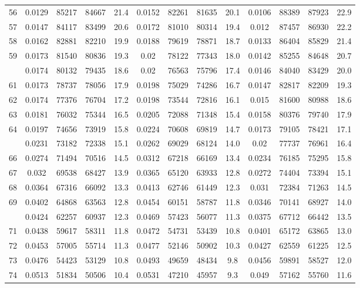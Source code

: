 \documentclass[
  14pt,
]{article}
\begin{document}
\begin{longtable}[t]{lcccccccccccc}
56 & 0.0129 & 85217 & 84667 & 21.4 & 0.0152 & 82261 & 81635 & 20.1 & 0.0106 & 88389 & 87923 & 22.9\\
57 & 0.0147 & 84117 & 83499 & 20.6 & 0.0172 & 81010 & 80314 & 19.4 & 0.012 & 87457 & 86930 & 22.2\\
58 & 0.0162 & 82881 & 82210 & 19.9 & 0.0188 & 79619 & 78871 & 18.7 & 0.0133 & 86404 & 85829 & 21.4\\
59 & 0.0173 & 81540 & 80836 & 19.3 & 0.02 & 78122 & 77343 & 18.0 & 0.0142 & 85255 & 84648 & 20.7\\
\addlinespace
60 & 0.0174 & 80132 & 79435 & 18.6 & 0.02 & 76563 & 75796 & 17.4 & 0.0146 & 84040 & 83429 & 20.0\\
61 & 0.0173 & 78737 & 78056 & 17.9 & 0.0198 & 75029 & 74286 & 16.7 & 0.0147 & 82817 & 82209 & 19.3\\
62 & 0.0174 & 77376 & 76704 & 17.2 & 0.0198 & 73544 & 72816 & 16.1 & 0.015 & 81600 & 80988 & 18.6\\
63 & 0.0181 & 76032 & 75344 & 16.5 & 0.0205 & 72088 & 71348 & 15.4 & 0.0158 & 80376 & 79740 & 17.9\\
64 & 0.0197 & 74656 & 73919 & 15.8 & 0.0224 & 70608 & 69819 & 14.7 & 0.0173 & 79105 & 78421 & 17.1\\
\addlinespace
65 & 0.0231 & 73182 & 72338 & 15.1 & 0.0262 & 69029 & 68124 & 14.0 & 0.02 & 77737 & 76961 & 16.4\\
66 & 0.0274 & 71494 & 70516 & 14.5 & 0.0312 & 67218 & 66169 & 13.4 & 0.0234 & 76185 & 75295 & 15.8\\
67 & 0.032 & 69538 & 68427 & 13.9 & 0.0365 & 65120 & 63933 & 12.8 & 0.0272 & 74404 & 73394 & 15.1\\
68 & 0.0364 & 67316 & 66092 & 13.3 & 0.0413 & 62746 & 61449 & 12.3 & 0.031 & 72384 & 71263 & 14.5\\
69 & 0.0402 & 64868 & 63563 & 12.8 & 0.0454 & 60151 & 58787 & 11.8 & 0.0346 & 70141 & 68927 & 14.0\\
\addlinespace
70 & 0.0424 & 62257 & 60937 & 12.3 & 0.0469 & 57423 & 56077 & 11.3 & 0.0375 & 67712 & 66442 & 13.5\\
71 & 0.0438 & 59617 & 58311 & 11.8 & 0.0472 & 54731 & 53439 & 10.8 & 0.0401 & 65172 & 63865 & 13.0\\
72 & 0.0453 & 57005 & 55714 & 11.3 & 0.0477 & 52146 & 50902 & 10.3 & 0.0427 & 62559 & 61225 & 12.5\\
73 & 0.0476 & 54423 & 53129 & 10.8 & 0.0493 & 49659 & 48434 & 9.8 & 0.0456 & 59891 & 58527 & 12.0\\
74 & 0.0513 & 51834 & 50506 & 10.4 & 0.0531 & 47210 & 45957 & 9.3 & 0.049 & 57162 & 55760 & 11.6\\

\end{longtable}
\end{document}

